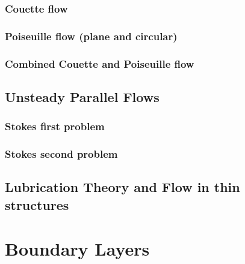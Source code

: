 \documentclass[oneside,a4paper,11pt]{report}
\begin{document}
\subsection{Couette flow} 

\subsection{Poiseuille flow (plane and circular)}

\subsection{Combined Couette and Poiseuille flow}

\section{Unsteady Parallel Flows}

\subsection{Stokes first problem}

\subsection{Stokes second problem}

\section{Lubrication Theory and Flow in thin structures}

\chapter{Boundary Layers}
\end{document}
